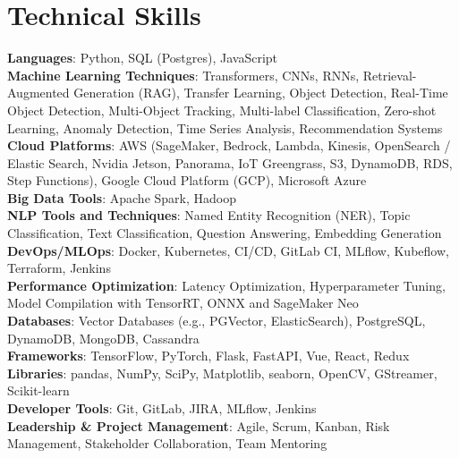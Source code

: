 \documentclass[letterpaper,11pt]{article}
\begin{document}
\section{Technical Skills}
\begin{itemize}[leftmargin=0.15in, label={}]
  \small{\item{
        \textbf{Languages}{: Python, SQL (Postgres), JavaScript} \\
        \textbf{Machine Learning Techniques}{: Transformers, CNNs, RNNs, Retrieval-Augmented Generation (RAG), Transfer Learning, Object Detection, Real-Time Object Detection, Multi-Object Tracking, Multi-label Classification, Zero-shot Learning, Anomaly Detection, Time Series Analysis, Recommendation Systems} \\
        \textbf{Cloud Platforms}{: AWS (SageMaker, Bedrock, Lambda, Kinesis, OpenSearch / Elastic Search, Nvidia Jetson, Panorama, IoT Greengrass, S3, DynamoDB, RDS, Step Functions), Google Cloud Platform (GCP), Microsoft Azure} \\
        \textbf{Big Data Tools}{: Apache Spark, Hadoop} \\
        \textbf{NLP Tools and Techniques}{: Named Entity Recognition (NER), Topic Classification, Text Classification, Question Answering, Embedding Generation} \\
        \textbf{DevOps/MLOps}{: Docker, Kubernetes, CI/CD, GitLab CI, MLflow, Kubeflow, Terraform, Jenkins} \\
        \textbf{Performance Optimization}{: Latency Optimization, Hyperparameter Tuning, Model Compilation with TensorRT, ONNX and SageMaker Neo} \\
        \textbf{Databases}{: Vector Databases (e.g., PGVector, ElasticSearch), PostgreSQL, DynamoDB, MongoDB, Cassandra} \\
        \textbf{Frameworks}{: TensorFlow, PyTorch, Flask, FastAPI, Vue, React, Redux} \\
        \textbf{Libraries}{: pandas, NumPy, SciPy, Matplotlib, seaborn, OpenCV, GStreamer, Scikit-learn} \\
        \textbf{Developer Tools}{: Git, GitLab, JIRA, MLflow, Jenkins} \\
        \textbf{Leadership \& Project Management}{: Agile, Scrum, Kanban, Risk Management, Stakeholder Collaboration, Team Mentoring}
        }}
\end{itemize}
\end{document}
